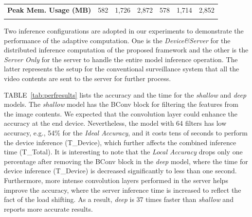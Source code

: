 \documentclass[conference]{IEEEtran}
\def\tablename{TABLE}
\begin{document}
\begin{table}[hbt]
{\begin{tabular}{lllllll}
    \multicolumn{1}{l|}{\textbf{Peak Mem. Usage (MB)}}                                                     & 582                                                 & 1,726                                              & \multicolumn{1}{l|}{2,872}                                              & 578                                               & 1,714                                                     & 2,852                                                     \\
                                                                                                                 &                                                     &                                                    &                                                                         &                                                   &                                                           &
    \end{tabular}
    }%
    \end{table}


Two inference configurations are adopted in our experiments to demonstrate the performance of the adaptive computation. One is the \emph{Device\&Server} for the distributed inference computation of the proposed framework and the other is the \emph{Server Only} for the server to handle the entire model inference operation. The latter represents the setup for the conventional surveillance system that all the video contents are sent to the server for further process.

\tablename~\ref{tab:perfresults} lists the accuracy and the time for the \emph{shallow} and \emph{deep} models. The \emph{shallow} model has the BConv block for filtering the features from the image contents. We expected that the convolution layer could enhance the accuracy at the end device. Nevertheless, the model with 64 filters has low accuracy, e.g., 54\% for the \emph{Ideal Accuracy}, and it costs tens of seconds to perform the device inference (T\_Device), which further affects the combined inference time (T\_Total). It is interesting to note that the \emph{Local Accuracy} drops only one percentage after removing the BConv block in the \emph{deep} model, where the time for device inference (T\_Device) is decreased significantly to less than one second. Furthermore, more intense convolution layers performed in the server helps improve the accuracy, where the server inference time is increased to reflect the fact of the load shifting. As a result, \emph{deep} is 37 times faster than \emph{shallow} and reports more accurate results.
\end{document}
